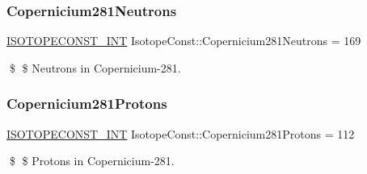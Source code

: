 \subsubsection{\texorpdfstring{Copernicium281\+Neutrons}{Copernicium281Neutrons}}
{\footnotesize\ttfamily \mbox{\hyperlink{group___isotope_const-_macros_ga5f18360b3e99483a35c32d789e62621c}{I\+S\+O\+T\+O\+P\+E\+C\+O\+N\+S\+T\+\_\+\+I\+NT}} Isotope\+Const\+::\+Copernicium281\+Neutrons = 169}

\$ \$ Neutrons in Copernicium-\/281. \mbox{\label{group___isotope_const-_copernicium-_cn281_ga90d8644aa72e7f4d7e76f594b2fc911e}} 
\subsubsection{\texorpdfstring{Copernicium281\+Protons}{Copernicium281Protons}}
{\footnotesize\ttfamily \mbox{\hyperlink{group___isotope_const-_macros_ga5f18360b3e99483a35c32d789e62621c}{I\+S\+O\+T\+O\+P\+E\+C\+O\+N\+S\+T\+\_\+\+I\+NT}} Isotope\+Const\+::\+Copernicium281\+Protons = 112}

\$ \$ Protons in Copernicium-\/281. 